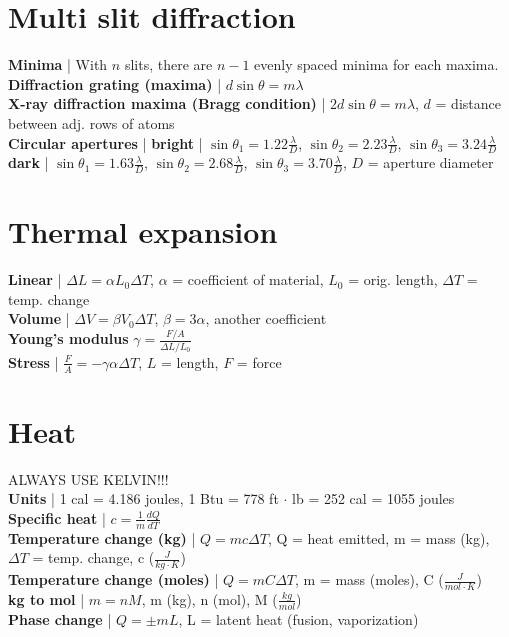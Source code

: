 \documentclass{article}
\begin{document}
\section{Multi slit diffraction}
\vspace{-2mm}
\textbf{Minima} | With $n$ slits, there are $n - 1$ evenly spaced minima for each maxima. \\
\textbf{Diffraction grating (maxima)} | $d\sin\theta = m\lambda$ \\
\textbf{X-ray diffraction maxima (Bragg condition)} | $2d\sin\theta = m\lambda$, $d$ = distance between adj. rows of atoms \\
\textbf{Circular apertures} | \textbf{bright} | $\sin\theta_1 = 1.22\frac{\lambda}{D}$, $\sin\theta_2 = 2.23\frac{\lambda}{D}$, $\sin\theta_3 = 3.24\frac{\lambda}{D}$ \\
\textbf{dark} | $\sin\theta_1 = 1.63\frac{\lambda}{D}$, $\sin\theta_2 = 2.68\frac{\lambda}{D}$, $\sin\theta_3 = 3.70\frac{\lambda}{D}$, $D$ = aperture diameter
\vspace{-5mm}
\section{Thermal expansion}
\vspace{-2mm}
\textbf{Linear} | $\Delta L = \alpha L_0 \Delta T$, $\alpha$ = coefficient of material, $L_0$ = orig. length, $\Delta T$ = temp. change \\
\textbf{Volume} | $\Delta V = \beta V_0 \Delta T$, $\beta = 3\alpha$, another coefficient \\
\textbf{Young's modulus} $\gamma = \frac{F/A}{\Delta L / L_0}$ \\
\textbf{Stress} | $\frac{F}{A} = -\gamma \alpha \Delta T$, $L$ = length, $F$ = force
\vspace{-5mm}
\section{Heat}
\vspace{-2mm}
ALWAYS USE KELVIN!!! \\
\textbf{Units} | 1 cal = 4.186 joules, 1 Btu = 778 ft $\cdot$ lb = 252 cal = 1055 joules \\
\textbf{Specific heat} | $c = \frac{1}{m}\frac{dQ}{dT}$ \\
\textbf{Temperature change (kg)} | $Q = mc \Delta T$, Q = heat emitted, m = mass (kg), $\Delta T$ = temp. change, c ($\frac{J}{kg \cdot K}$) \\
\textbf{Temperature change (moles)} | $Q = mC \Delta T$, m = mass (moles), C ($\frac{J}{mol \cdot K}$) \\
\textbf{kg to mol} | $m = nM$, m (kg), n (mol), M ($\frac{kg}{mol}$) \\
\textbf{Phase change} | $Q = \pm mL$, L = latent heat (fusion, vaporization) \\
\vspace{-5mm}
\end{document}
